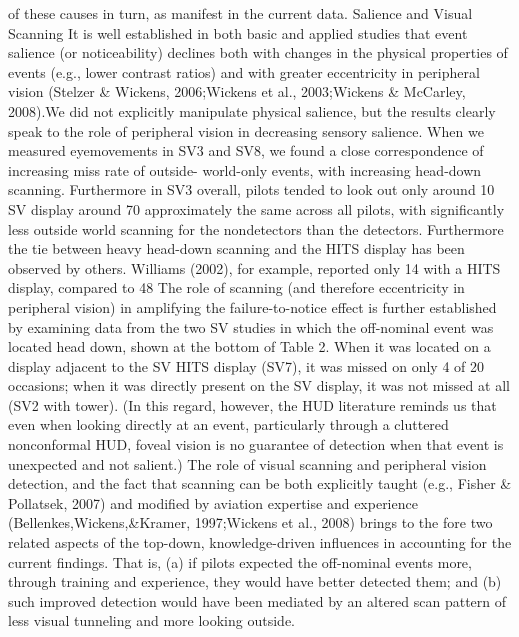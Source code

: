 \documentclass[utf8,bachelor,manualbib]{gradu3}
\begin{document}
of these causes in turn, as manifest in the current data. Salience and Visual Scanning
It is well established in both basic and applied studies that event salience (or
noticeability) declines both with changes in the physical properties of events (e.g.,
lower contrast ratios) and with greater eccentricity in peripheral vision (Stelzer \&
Wickens, 2006;Wickens et al., 2003;Wickens \& McCarley, 2008).We did not explicitly
manipulate physical salience, but the results clearly speak to the role of peripheral
vision in decreasing sensory salience. When we measured eyemovements
in SV3 and SV8, we found a close correspondence of increasing miss rate of outside-
world-only events, with increasing head-down scanning. Furthermore in SV3
overall, pilots tended to look out only around 10%
SV display around 70%
approximately the same across all pilots, with significantly less outside world
scanning for the nondetectors than the detectors. Furthermore the tie between
heavy head-down scanning and the HITS display has been observed by others.
Williams (2002), for example, reported only 14%
with a HITS display, compared to 48%
The role of scanning (and therefore eccentricity in peripheral vision) in amplifying
the failure-to-notice effect is further established by examining data from the
two SV studies in which the off-nominal event was located head down, shown at
the bottom of Table 2. When it was located on a display adjacent to the SV HITS
display (SV7), it was missed on only 4 of 20 occasions; when it was directly present
on the SV display, it was not missed at all (SV2 with tower). (In this regard,
however, the HUD literature reminds us that even when looking directly at an
event, particularly through a cluttered nonconformal HUD, foveal vision is no
guarantee of detection when that event is unexpected and not salient.) The role of visual scanning and peripheral vision detection, and the fact that scanning
can be both explicitly taught (e.g., Fisher \& Pollatsek, 2007) and modified by
aviation expertise and experience (Bellenkes,Wickens,\&Kramer, 1997;Wickens et
al., 2008) brings to the fore two related aspects of the top-down, knowledge-driven
influences in accounting for the current findings. That is, (a) if pilots expected the
off-nominal events more, through training and experience, they would have better
detected them; and (b) such improved detection would have been mediated by an altered
scan pattern of less visual tunneling and more looking outside.
\end{document}
